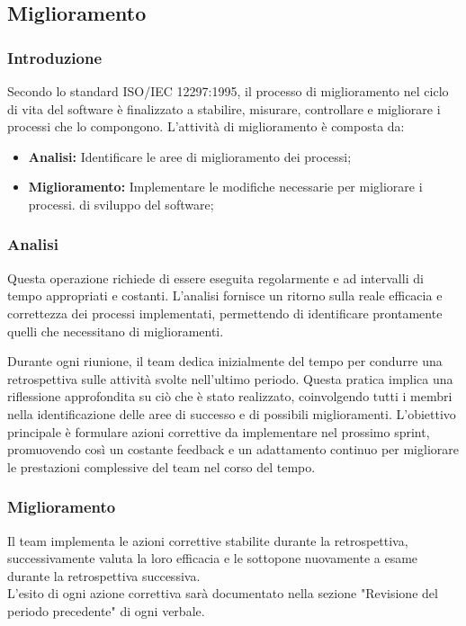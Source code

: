 \subsection{Miglioramento}
\subsubsection{Introduzione}
Secondo lo standard ISO/IEC 12297:1995, il processo di miglioramento nel ciclo di vita del software è finalizzato a stabilire, misurare, controllare e migliorare i processi che lo compongono.
L'attività di miglioramento è composta da:
 \begin{itemize}
    \item \textbf{Analisi:} Identificare le aree di miglioramento dei processi;
    \item  \textbf{Miglioramento:} Implementare le modifiche necessarie per migliorare i processi.
    di sviluppo del software;
 \end{itemize}
 \subsubsection{Analisi}
Questa operazione richiede di essere eseguita regolarmente e ad intervalli di tempo appropriati e costanti. L'analisi fornisce un ritorno sulla reale efficacia e correttezza dei processi implementati, permettendo di identificare prontamente quelli che necessitano di miglioramenti.

\vspace*{0.1cm}

Durante ogni riunione, il team dedica inizialmente del tempo per condurre una retrospettiva sulle attività svolte nell'ultimo periodo. Questa pratica implica una riflessione approfondita su ciò che è stato realizzato, coinvolgendo tutti i membri nella identificazione delle aree di successo e di possibili miglioramenti. L'obiettivo principale è formulare azioni correttive da implementare nel prossimo sprint, promuovendo così un costante feedback e un adattamento continuo per migliorare le prestazioni complessive del team nel corso del tempo.
 \subsubsection{Miglioramento}
 Il team implementa le azioni correttive stabilite durante la retrospettiva, successivamente valuta la loro efficacia e le sottopone nuovamente a esame durante la retrospettiva successiva.\\
L'esito di ogni azione correttiva sarà documentato nella sezione "Revisione del periodo precedente" di ogni verbale.
